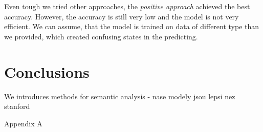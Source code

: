 \documentclass{sig-alternate}
\begin{document}
Even tough we tried other approaches, the {\it positive approach} achieved the best accuracy.
However, the accuracy is still very low and the model is not very efficient.
We can assume, that the model is trained on data of different type than we provided, which created confusing states in the predicting.

\section{Conclusions}
We introduces methods for semantic analysis 
- nase modely jsou lepsi nez stanford




%
%
\appendix
Appendix A
\end{document}
